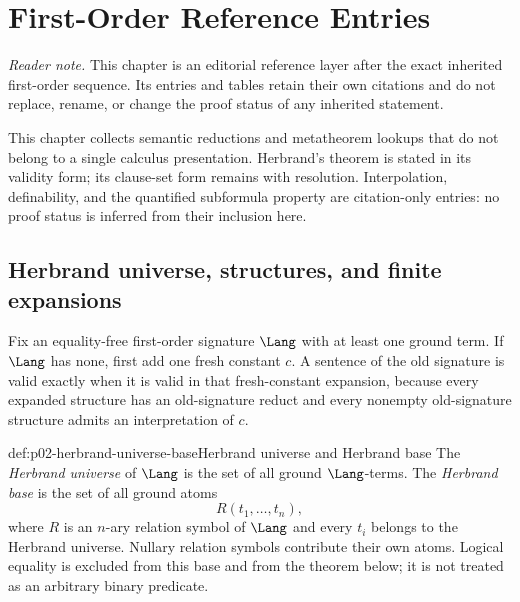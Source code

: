 
\chapter{First-Order Reference Entries}
\label{sec:p02-first-order-depth}

\noindent\textit{Reader note.}  This chapter is an editorial reference layer
after the exact inherited first-order sequence.  Its entries and tables retain
their own citations and do not replace, rename, or change the proof status of
any inherited statement.

This chapter collects semantic reductions and metatheorem lookups that do not
belong to a single calculus presentation.  Herbrand's theorem is stated in its
validity form; its clause-set form remains with resolution.  Interpolation,
definability, and the quantified subformula property are citation-only entries:
no proof status is inferred from their inclusion here.

\section{Herbrand universe, structures, and finite expansions}
\label{sec:p02-herbrand-validity}

Fix an equality-free first-order signature \(\Lang\) with at least one ground
term.  If \(\Lang\) has none, first add one fresh constant \(c\).  A sentence
of the old signature is valid exactly when it is valid in that fresh-constant
expansion, because every expanded structure has an old-signature reduct and
every nonempty old-signature structure admits an interpretation of \(c\).

\begin{hbdefinition}{def:p02-herbrand-universe-base}{Herbrand universe and Herbrand base}
The \emph{Herbrand universe} of \(\Lang\) is the set of all ground
\(\Lang\)-terms.  The \emph{Herbrand base} is the set of all ground atoms
\[
  R(t_1,\ldots,t_n),
\]
where \(R\) is an \(n\)-ary relation symbol of \(\Lang\) and every \(t_i\)
belongs to the Herbrand universe.  Nullary relation symbols contribute their
own atoms.  Logical equality is excluded from this base and from the theorem
below; it is not treated as an arbitrary binary predicate.
\end{hbdefinition}

